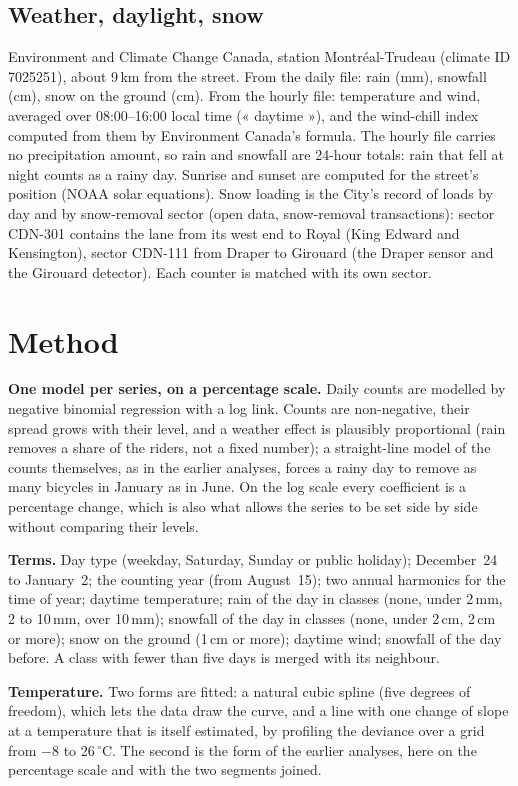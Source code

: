 \documentclass[11pt,a4paper]{article}
\begin{document}
\subsection{Weather, daylight, snow}
Environment and Climate Change Canada, station Montréal-Trudeau (climate ID 7025251), about 9\,km from the street. From the daily file: rain (mm), snowfall (cm), snow on the ground (cm). From the hourly file: temperature and wind, averaged over 08:00--16:00 local time (« daytime »), and the wind-chill index computed from them by Environment Canada\textquoteright{}s formula. The hourly file carries no precipitation amount, so rain and snowfall are 24-hour totals: rain that fell at night counts as a rainy day. Sunrise and sunset are computed for the street\textquoteright{}s position (NOAA solar equations). Snow loading is the City\textquoteright{}s record of loads by day and by snow-removal sector (open data, snow-removal transactions): sector CDN-301 contains the lane from its west end to Royal (King Edward and Kensington), sector CDN-111 from Draper to Girouard (the Draper sensor and the Girouard detector). Each counter is matched with its own sector.

\section{Method}
\textbf{One model per series, on a percentage scale.} Daily counts are modelled by negative binomial regression with a log link. Counts are non-negative, their spread grows with their level, and a weather effect is plausibly proportional (rain removes a share of the riders, not a fixed number); a straight-line model of the counts themselves, as in the earlier analyses, forces a rainy day to remove as many bicycles in January as in June. On the log scale every coefficient is a percentage change, which is also what allows the series to be set side by side without comparing their levels.

\textbf{Terms.} Day type (weekday, Saturday, Sunday or public holiday); December~24 to January~2; the counting year (from August~15); two annual harmonics for the time of year; daytime temperature; rain of the day in classes (none, under 2\,mm, 2 to 10\,mm, over 10\,mm); snowfall of the day in classes (none, under 2\,cm, 2\,cm or more); snow on the ground (1\,cm or more); daytime wind; snowfall of the day before. A class with fewer than five days is merged with its neighbour.

\textbf{Temperature.} Two forms are fitted: a natural cubic spline (five degrees of freedom), which lets the data draw the curve, and a line with one change of slope at a temperature that is itself estimated, by profiling the deviance over a grid from $-$8 to 26\,$^\circ$C. The second is the form of the earlier analyses, here on the percentage scale and with the two segments joined.
\end{document}
